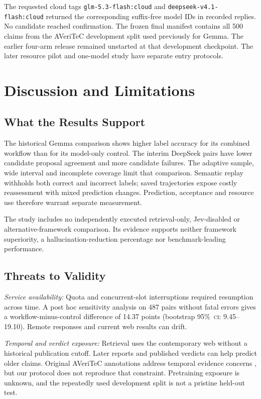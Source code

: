 \documentclass[conference]{IEEEtran}
\newcommand{\CI}{\textsc{ci}}
\newcommand{\pct}{\%}
\begin{document}
The requested cloud tags \texttt{glm-5.3-flash:cloud} and \texttt{deepseek-v4.1-flash:cloud} returned the corresponding suffix-free model IDs in recorded replies. No candidate reached confirmation. The frozen final manifest contains all 500 claims from the AVeriTeC development split used previously for Gemma. The earlier four-arm release remained unstarted at that development checkpoint. The later resource pilot and one-model study have separate entry protocols.

\section{Discussion and Limitations}
\subsection{What the Results Support}
The historical Gemma comparison shows higher label accuracy for its combined workflow than for its model-only control. The interim DeepSeek pairs have lower candidate proposal agreement and more candidate failures. The adaptive sample, wide interval and incomplete coverage limit that comparison. Semantic replay withholds both correct and incorrect labels; saved trajectories expose costly reassessment with mixed prediction changes. Prediction, acceptance and resource use therefore warrant separate measurement.

The study includes no independently executed retrieval-only, Jev-disabled or alternative-framework comparison. Its evidence supports neither framework superiority, a hallucination-reduction percentage nor benchmark-leading performance.

\subsection{Threats to Validity}
\textit{Service availability:} Quota and concurrent-slot interruptions required resumption across time. A post hoc sensitivity analysis on 487 pairs without fatal errors gives a workflow-minus-control difference of 14.37 points (bootstrap 95\pct\ \CI: 9.45--19.10). Remote responses and current web results can drift.

\textit{Temporal and verdict exposure:} Retrieval uses the contemporary web without a historical publication cutoff. Later reports and published verdicts can help predict older claims. Original AVeriTeC annotations address temporal evidence concerns \cite{averitec}, but our protocol does not reproduce that constraint. Pretraining exposure is unknown, and the repeatedly used development split is not a pristine held-out test.
\end{document}
